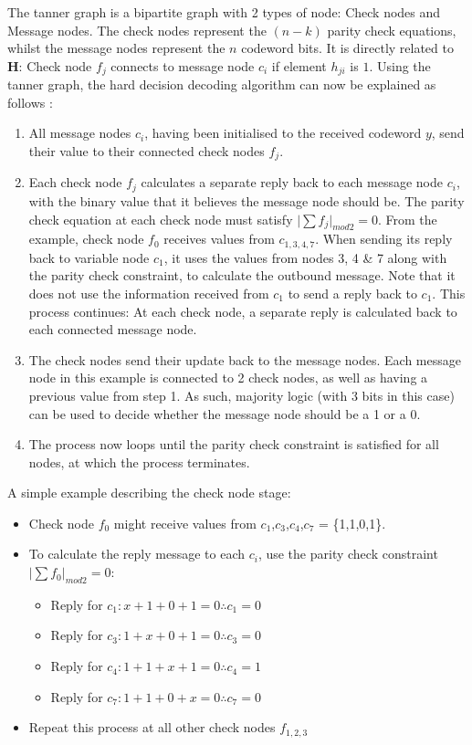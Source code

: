 \documentclass[11pt]{article}
\numberwithin{equation}{subsection}
\begin{document}
The tanner graph is a bipartite graph with 2 types of node: Check nodes and Message nodes. The check nodes represent the $(n-k)$ parity check equations, whilst the message nodes represent the $n$ codeword bits. It is directly related to $\mathbf{H}$: Check node $f_j$ connects to message node $c_i$ if element $h_{ji}$ is $1$. Using the tanner graph, the hard decision decoding algorithm can now be explained as follows \cite{ldpc-tutorial1}:
\begin{enumerate}
\item All message nodes $c_i$, having been initialised to the received codeword $y$, send their value to their connected check nodes $f_j$.
\item Each check node $f_j$ calculates a separate reply back to each message node $c_i$, with the binary value that it believes the message node should be. The parity check equation at each check node must satisfy $\lvert \sum f_j \rvert_{mod2} = 0$. From the example, check node $f_0$ receives values from $c_{1,3,4,7}$. When sending its reply back to variable node $c_1$, it uses the values from nodes 3, 4 \& 7 along with the parity check constraint, to calculate the outbound message. Note that it does not use the information received from $c_1$ to send a reply back to $c_1$. This process continues: At each check node, a separate reply is calculated back to each connected message node.
\item The check nodes send their update back to the message nodes. Each message node in this example is connected to 2 check nodes, as well as having a previous value from step 1. As such, majority logic (with 3 bits in this case) can be used to decide whether the message node should be a 1 or a 0. 
\item The process now loops until the parity check constraint is satisfied for all nodes, at which the process terminates.
\end{enumerate}

\noindent A simple example describing the check node stage:
\begin{itemize}
\item Check node $f_0$ might receive values from $c_1$,$c_3$,$c_4$,$c_7$ = \{1,1,0,1\}.
\item To calculate the reply message to each $c_i$, use the parity check constraint $\lvert \sum f_0 \rvert_{mod2} = 0$:
\begin{itemize}
\item Reply for $c_1 : x + 1 + 0 + 1 = 0 \therefore c_1 = 0$ 
\item Reply for $c_3 : 1 + x + 0 + 1 = 0 \therefore c_3 = 0$ 
\item Reply for $c_4 : 1 + 1 + x + 1 = 0 \therefore c_4 = 1$ 
\item Reply for $c_7 : 1 + 1 + 0 + x = 0 \therefore c_7 = 0$
\end{itemize}
\item Repeat this process at all other check nodes $f_{1,2,3}$
\end{itemize}
\end{document}
